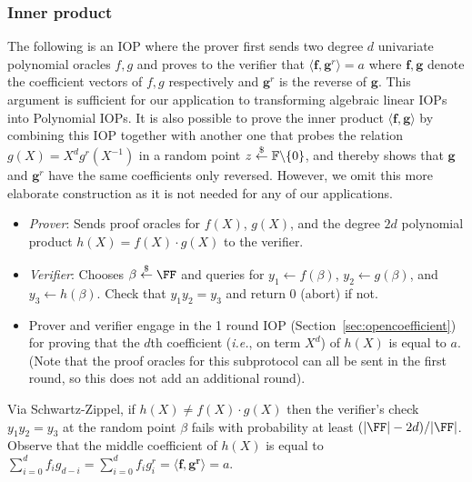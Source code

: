  

\subsubsection{Inner product}\label{sec:innerproduct}
The following is an IOP where the prover first sends two degree $d$ univariate polynomial oracles $f, g$ and proves to the verifier that $\langle \mathbf{f}, \mathbf{g}^r \rangle = a$ where $\mathbf{f}, \mathbf{g}$ denote the coefficient vectors of $f, g$ respectively and $\mathbf{g}^r$ is the reverse of $\mathbf{g}$. This argument is sufficient for our application to transforming algebraic linear IOPs into Polynomial IOPs. It is also possible to prove the inner product $\langle \mathbf{f}, \mathbf{g} \rangle$ by combining this IOP together with another one that probes the relation $g(X) = X^dg^r(X^{-1})$ in a random point $z \overset{\$}{\gets} \mathbb{F} \backslash \{0\}$, and thereby shows that $\mathbf{g}$ and $\mathbf{g}^r$ have the same coefficients only reversed. However, we omit this more elaborate construction as it is not needed for any of our applications.

\begin{itemize}
\item \emph{Prover}: Sends proof oracles for $f(X)$, $g(X)$, and the degree $2d$ polynomial product $h(X) = f(X)\cdot g(X)$ to the verifier. 
\item \emph{Verifier}: Chooses $\beta \sample \FF$ and queries for $y_1 \leftarrow f(\beta)$, $y_2 \leftarrow g(\beta)$, and $y_3 \leftarrow h(\beta)$. Check that $y_1 y_2 = y_3$ and return $0$ (abort) if not.
\item Prover and verifier engage in the 1 round IOP (Section~\ref{sec:opencoefficient}) for proving that the $d$th coefficient (\emph{i.e.}, on term $X^d$) of $h(X)$ is equal to $a$. (Note that the proof oracles for this subprotocol can all be sent in the first round, so this does not add an additional round). %
\end{itemize}

Via Schwartz-Zippel, if $h(X) \neq f(X) \cdot g(X)$ then the verifier's check $y_1 y_2 = y_3$ at the random point $\beta$ fails with probability at least $(|\FF| - 2d)/|\FF|$. %
Observe that the middle coefficient of $h(X)$ is equal to $\sum_{i=0}^d f_i g_{d-i} = \sum_{i=0}^d f_i g^r_i = \langle \mathbf{f}, \mathbf{g^r} \rangle = a$.

